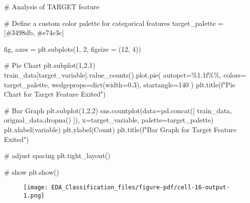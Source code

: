 \documentclass[
  letterpaper,
  DIV=11,
  numbers=noendperiod]{scrartcl}
\newenvironment{Shaded}{\begin{snugshade}}{\end{snugshade}}
\newcommand{\BuiltInTok}[1]{\textcolor[rgb]{0.00,0.23,0.31}{#1}}
\newcommand{\CommentTok}[1]{\textcolor[rgb]{0.37,0.37,0.37}{#1}}
\newcommand{\DecValTok}[1]{\textcolor[rgb]{0.68,0.00,0.00}{#1}}
\newcommand{\FloatTok}[1]{\textcolor[rgb]{0.68,0.00,0.00}{#1}}
\newcommand{\NormalTok}[1]{\textcolor[rgb]{0.00,0.23,0.31}{#1}}
\newcommand{\OperatorTok}[1]{\textcolor[rgb]{0.37,0.37,0.37}{#1}}
\newcommand{\SpecialCharTok}[1]{\textcolor[rgb]{0.37,0.37,0.37}{#1}}
\newcommand{\SpecialStringTok}[1]{\textcolor[rgb]{0.13,0.47,0.30}{#1}}
\newcommand{\StringTok}[1]{\textcolor[rgb]{0.13,0.47,0.30}{#1}}
\begin{document}
\begin{Shaded}
\begin{Highlighting}[]
\CommentTok{\# Analysis of TARGET feature}

\CommentTok{\# Define a custom color palette for categorical features}
\NormalTok{target\_palette }\OperatorTok{=}\NormalTok{ [}\StringTok{\textquotesingle{}\#3498db\textquotesingle{}}\NormalTok{, }\StringTok{\textquotesingle{}\#e74c3c\textquotesingle{}}\NormalTok{]}

\NormalTok{fig, axes }\OperatorTok{=}\NormalTok{ plt.subplots(}\DecValTok{1}\NormalTok{, }\DecValTok{2}\NormalTok{, figsize }\OperatorTok{=}\NormalTok{ (}\DecValTok{12}\NormalTok{, }\DecValTok{4}\NormalTok{))}

\CommentTok{\# Pie Chart}
\NormalTok{plt.subplot(}\DecValTok{1}\NormalTok{,}\DecValTok{2}\NormalTok{,}\DecValTok{1}\NormalTok{)}
\NormalTok{train\_data[target\_variable].value\_counts().plot.pie(}
\NormalTok{    autopct}\OperatorTok{=}\StringTok{\textquotesingle{}}\SpecialCharTok{\%1.1f\%\%}\StringTok{\textquotesingle{}}\NormalTok{, colors}\OperatorTok{=}\NormalTok{ target\_palette, }
\NormalTok{    wedgeprops}\OperatorTok{=}\BuiltInTok{dict}\NormalTok{(width}\OperatorTok{=}\FloatTok{0.3}\NormalTok{), startangle}\OperatorTok{=}\DecValTok{140}
\NormalTok{)}
\NormalTok{plt.title(}\SpecialStringTok{f"Pie Chart for Target Feature \textquotesingle{}Exited\textquotesingle{}"}\NormalTok{)}

\CommentTok{\# Bar Graph}
\NormalTok{plt.subplot(}\DecValTok{1}\NormalTok{,}\DecValTok{2}\NormalTok{,}\DecValTok{2}\NormalTok{)}
\NormalTok{sns.countplot(data}\OperatorTok{=}\NormalTok{pd.concat([}
\NormalTok{    train\_data, orignal\_data.dropna()}
\NormalTok{]),}
\NormalTok{              x}\OperatorTok{=}\NormalTok{target\_variable, palette}\OperatorTok{=}\NormalTok{target\_palette)}
\NormalTok{plt.xlabel(variable)}
\NormalTok{plt.ylabel(}\StringTok{\textquotesingle{}Count\textquotesingle{}}\NormalTok{)}
\NormalTok{plt.title(}\SpecialStringTok{f"Bar Graph for Target Feature \textquotesingle{}Exited\textquotesingle{}"}\NormalTok{)}

\CommentTok{\# adjust spacing}
\NormalTok{plt.tight\_layout()}

\CommentTok{\# show}
\NormalTok{plt.show()}
\end{Highlighting}
\end{Shaded}

\begin{figure}[H]

{\centering \texttt{[image: EDA\_Classification\_files/figure-pdf/cell-16-output-1.png]}

}

\end{figure}
\end{document}
